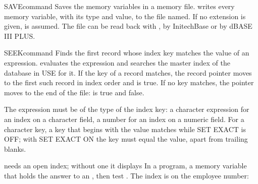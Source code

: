 
\begin{XbaseEntry}{SAVE}{command}
Saves the memory variables in a memory file.
\Syntax
{}
\Usage
{} writes every memory variable, with its type and value, to the
file named.  If no extension is given,  is assumed.  The file can
be read back with , by InitechBase or by dBASE III PLUS.
\Examples
{}
\end{XbaseEntry}

\begin{XbaseEntry}{SEEK}{command}
Finds the first record whose index key matches the value of an expression.
\Syntax
{}
\Usage
{} evaluates the expression and searches the master index of the
database in USE for it.  If the key of a record matches, the record pointer
moves to the first such record in index order and  is true.  If
no key matches, the pointer moves to the end of the file:  is true
and  false.

The expression must be of the type of the index key: a character expression
for an index on a character field, a number for an index on a numeric field.
For a character key, a key that begins with the value matches while SET EXACT
is OFF; with SET EXACT ON the key must equal the value, apart from trailing
blanks.

 needs an open index; without one it displays
\Tips
In a program,  a memory variable that holds the answer to an
, then test .
\Examples
{}
The index  is on the employee number:
\end{XbaseEntry}

